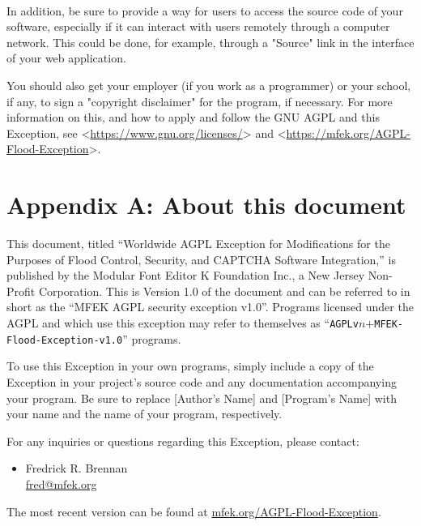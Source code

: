 \documentclass[a5paper,14pt]{extreport}
\begin{document}
~\\

In addition, be sure to provide a way for users to access the source code of your software,
especially if it can interact with users remotely through a computer network. This could be done,
for example, through a "Source" link in the interface of your web application.

You should also get your employer (if you work as a programmer) or your school, if any, to sign a
"copyright disclaimer" for the program, if necessary. For more information on this, and how to apply
and follow the GNU AGPL and this Exception, see <\url{https://www.gnu.org/licenses/}> and
<\url{https://mfek.org/AGPL-Flood-Exception}>.

\section*{Appendix A: About this document}
This document, titled ``Worldwide AGPL Exception for Modifications for the Purposes of Flood
Control, Security, and CAPTCHA Software Integration,'' is published by the Modular Font Editor K
Foundation Inc., a New Jersey Non-Profit Corporation. This is Version 1.0 of the document and can be
referred to in short as the ``MFEK AGPL security exception v1.0''. Programs licensed under the AGPL
and which use this exception may refer to themselves as
``\texttt{AGPLv$n$$+$MFEK-Flood-Exception-v1.0}'' programs.

To use this Exception in your own programs, simply include a copy of the Exception in your project's
source code and any documentation accompanying your program. Be sure to replace [Author's Name] and
[Program's Name] with your name and the name of your program, respectively.

For any inquiries or questions regarding this Exception, please contact:

\begin{itemize}
	\item Fredrick R. Brennan \\
\href{mailto:fred@mfek.org}{\ttfamily fred@mfek.org}
\end{itemize}

The most recent version can be found at \url{mfek.org/AGPL-Flood-Exception}.
\end{document}
